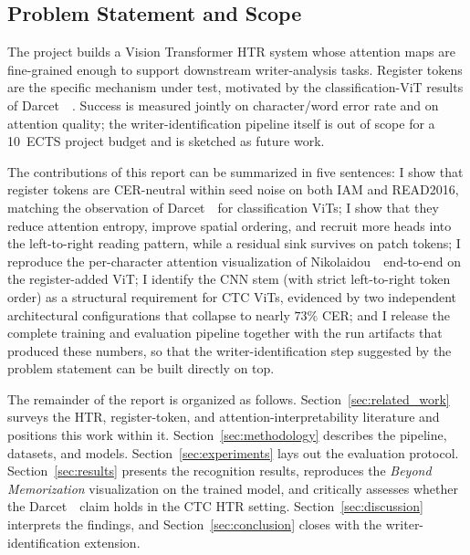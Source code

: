 \subsection{Problem Statement and Scope}
\label{sec:problem}

The project builds a Vision Transformer HTR system whose attention maps are fine-grained enough to support downstream writer-analysis tasks. Register tokens are the specific mechanism under test, motivated by the classification-ViT results of Darcet~\etal~\cite{darcet2024registers}. Success is measured jointly on character/word error rate and on attention quality; the writer-identification pipeline itself is out of scope for a 10~ECTS project budget and is sketched as future work.

The contributions of this report can be summarized in five sentences: I show that register tokens are CER-neutral within seed noise on both IAM and READ2016, matching the observation of Darcet~\etal\ for classification ViTs; I show that they reduce attention entropy, improve spatial ordering, and recruit more heads into the left-to-right reading pattern, while a residual sink survives on patch tokens; I reproduce the per-character attention visualization of Nikolaidou~\etal\ end-to-end on the register-added ViT; I identify the CNN stem (with strict left-to-right token order) as a structural requirement for CTC ViTs, evidenced by two independent architectural configurations that collapse to nearly $73\%$ CER; and I release the complete training and evaluation pipeline together with the run artifacts that produced these numbers, so that the writer-identification step suggested by the problem statement can be built directly on top.

The remainder of the report is organized as follows. Section~\ref{sec:related_work} surveys the HTR, register-token, and attention-interpretability literature and positions this work within it. Section~\ref{sec:methodology} describes the pipeline, datasets, and models. Section~\ref{sec:experiments} lays out the evaluation protocol. Section~\ref{sec:results} presents the recognition results, reproduces the \emph{Beyond Memorization} visualization on the trained model, and critically assesses whether the Darcet~\etal\ claim holds in the CTC HTR setting. Section~\ref{sec:discussion} interprets the findings, and Section~\ref{sec:conclusion} closes with the writer-identification extension.
